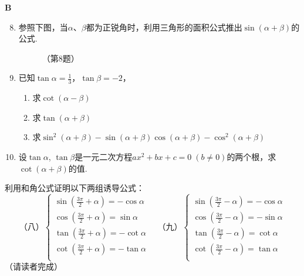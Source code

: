 \begin{center}
    \bfseries B
\end{center}

\begin{enumerate}\setcounter{enumi}{7}
    \item 参照下图，当$\alpha$、$\beta$都为正锐角时，利用三角形的面积公式推出$\sin(\alpha+\beta)$的公式.
\begin{figure}[htp]
    \centering
{}
    \caption*{（第8题）}
\end{figure}

\item 已知$\tan\alpha=\frac{1}{3}$，$\tan\beta=-2$，
\begin{enumerate}[(1)]
    \item 求$\cot(\alpha-\beta)$
    \item 求$\tan(\alpha+\beta)$
    \item 求$\sin^2(\alpha+\beta)-\sin(\alpha+\beta)\cos(\alpha+\beta)-\cos^2(\alpha+\beta)$
\end{enumerate}

\item 设$\tan\alpha$, $\tan\beta$是一元二次方程$ax^2+bx+c=0\; (b\ne 0)$的两个根，求$\cot(\alpha+\beta)$的值.
\end{enumerate}

\begin{example}
 利用和角公式证明以下两组诱导公式：  
\[\text{（八）}\begin{cases}
    \sin\left(\frac{3\pi}{2}+\alpha\right)=-\cos\alpha\\
    \cos\left(\frac{3\pi}{2}+\alpha\right)=\sin\alpha\\
    \tan\left(\frac{3\pi}{2}+\alpha\right)=-\cot\alpha\\
    \cot\left(\frac{3\pi}{2}+\alpha\right)=-\tan\alpha\\
\end{cases}\quad \text{（九）}\begin{cases}
    \sin\left(\frac{3\pi}{2}-\alpha\right)=-\cos\alpha\\
    \cos\left(\frac{3\pi}{2}-\alpha\right)=-\sin\alpha\\
    \tan\left(\frac{3\pi}{2}-\alpha\right)=\cot\alpha\\
    \cot\left(\frac{3\pi}{2}-\alpha\right)=\tan\alpha\\
\end{cases}\]
 （请读者完成）
\end{example}

